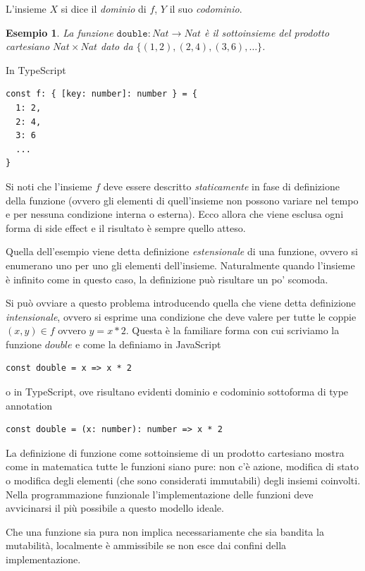\documentclass[12pt]{article}
\newtheorem{example}{Esempio}[section]
\begin{document}
L'insieme $X$ si dice il \emph{dominio} di $f$, $Y$ il suo \emph{codominio}.

\begin{example}
La funzione $\texttt{double}: Nat \rightarrow Nat$ è il sottoinsieme del prodotto cartesiano $Nat \times Nat$ dato da $\{ (1, 2), (2, 4), (3, 6), \ldots \}$.
\end{example}

In TypeScript
\begin{verbatim}
const f: { [key: number]: number } = {
  1: 2,
  2: 4,
  3: 6
  ...
}
\end{verbatim}

Si noti che l'insieme $f$ deve essere descritto \emph{staticamente} in fase di definizione della funzione
(ovvero gli elementi di quell'insieme non possono variare nel tempo e per nessuna condizione interna o esterna).
Ecco allora che viene esclusa ogni forma di side effect e il risultato è sempre quello atteso.

Quella dell'esempio viene detta definizione \emph{estensionale} di una funzione, ovvero si enumerano uno per uno gli elementi dell'insieme.
Naturalmente quando l'insieme è infinito come in questo caso, la definizione può risultare un po' scomoda.

Si può ovviare a questo problema introducendo quella che viene detta definizione \emph{intensionale},
ovvero si esprime una condizione che deve valere per tutte le coppie $(x, y) \in f$ ovvero $y = x * 2$. Questa è la familiare forma con cui scriviamo la funzione $double$ e come la definiamo in JavaScript

\begin{verbatim}
const double = x => x * 2
\end{verbatim}

o in TypeScript, ove risultano evidenti dominio e codominio sottoforma di type annotation

\begin{verbatim}
const double = (x: number): number => x * 2
\end{verbatim}

La definizione di funzione come sottoinsieme di un prodotto cartesiano mostra come in matematica tutte le funzioni siano pure:
non c'è azione, modifica di stato o modifica degli elementi (che sono considerati immutabili) degli insiemi coinvolti.
Nella programmazione funzionale l'implementazione delle funzioni deve avvicinarsi il più possibile a questo modello ideale.

Che una funzione sia pura non implica necessariamente che sia bandita la mutabilità, localmente è ammissibile
se non esce dai confini della implementazione.
\end{document}
